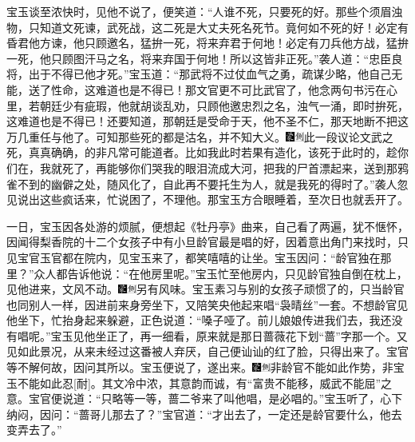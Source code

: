 宝玉谈至浓快时，见他不说了，便笑道：“人谁不死，只要死的好。那些个须眉浊物，只知道文死谏，武死战，这二死是大丈夫死名死节。竟何如不死的好！必定有昏君他方谏，他只顾邀名，猛拚一死，将来弃君于何地！必定有刀兵他方战，猛拚一死，他只顾图汗马之名，将来弃国于何地！所以这皆非正死。”袭人道：“忠臣良将，出于不得已他才死。”宝玉道：“那武将不过仗血气之勇，疏谋少略，他自己无能，送了性命，这难道也是不得已！那文官更不可比武官了，他念两句书污在心里，若朝廷少有疵瑕，他就胡谈乱劝，只顾他邀忠烈之名，浊气一涌，即时拚死，这难道也是不得已！还要知道，那朝廷是受命于天，他不圣不仁，那天地断不把这万几重任与他了。可知那些死的都是沽名，并不知大义。{\includegraphics[width=3mm]{../Images/00006}\includegraphics[width=3mm]{../Images/00011}\footnotesize \kaishu 此一段议论文武之死，真真确确，的非凡常可能道者。}比如我此时若果有造化，该死于此时的，趁你们在，我就死了，再能够你们哭我的眼泪流成大河，把我的尸首漂起来，送到那鸦雀不到的幽僻之处，随风化了，自此再不要托生为人，就是我死的得时了。”袭人忽见说出这些疯话来，忙说困了，不理他。那宝玉方合眼睡着，至次日也就丢开了。

一日，宝玉因各处游的烦腻，便想起《牡丹亭》曲来，自己看了两遍，犹不惬怀，因闻得梨香院的十二个女孩子中有小旦龄官最是唱的好，因着意出角门来找时，只见宝官玉官都在院内，见宝玉来了，都笑嘻嘻的让坐。宝玉因问：“龄官独在那里？”众人都告诉他说：“在他房里呢。”宝玉忙至他房内，只见龄官独自倒在枕上，见他进来，文风不动。{\includegraphics[width=3mm]{../Images/00006}\includegraphics[width=3mm]{../Images/00011}\footnotesize \kaishu 另有风味。}宝玉素习与别的女孩子顽惯了的，只当龄官也同别人一样，因进前来身旁坐下，又陪笑央他起来唱“袅晴丝”一套。不想龄官见他坐下，忙抬身起来躲避，正色说道：“嗓子哑了。前儿娘娘传进我们去，我还没有唱呢。”宝玉见他坐正了，再一细看，原来就是那日蔷薇花下划“蔷”字那一个。又见如此景况，从来未经过这番被人弃厌，自己便讪讪的红了脸，只得出来了。宝官等不解何故，因问其所以。宝玉便说了，遂出来。{\includegraphics[width=3mm]{../Images/00006}\includegraphics[width=3mm]{../Images/00011}\footnotesize \kaishu 非龄官不能如此作势，非宝玉不能如此忍{[}耐{]}。其文冷中浓，其意韵而诚，有“富贵不能移，威武不能屈”之意。}宝官便说道：“只略等一等，蔷二爷来了叫他唱，是必唱的。”宝玉听了，心下纳闷，因问：“蔷哥儿那去了？”宝官道：“才出去了，一定还是龄官要什么，他去变弄去了。”

